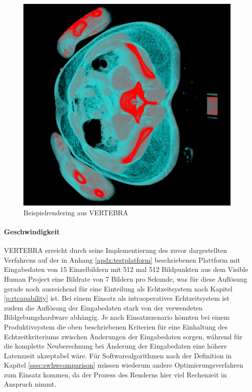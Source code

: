 \documentclass[ngerman,pdftex,paper=A4,DIV=calc,titlepage,12pt]{scrartcl}
\newtheorem[L]{boxedDefinition}{Definition}
\begin{document}
\begin{figure}[p]
\begin{center}
\includegraphics[width=\textwidth]{graphics/vertebra-screenshot-1.png}
\caption{Beispielrendering aus VERTEBRA}
\label{fig:vertebra-screenshot}
\end{center}
\end{figure}\label{ssec:implementations}

\paragraph{Geschwindigkeit}
VERTEBRA erreicht durch seine Implementierung des zuvor dargestellten Verfahrens auf der in Anhang \vref{apdx:testplatform} beschriebenen Plattform mit Eingabedaten von 15 Einzelbildern mit 512 mal 512 Bildpunkten aus dem Visible Human Project eine Bildrate von 7 Bildern pro Sekunde, was für diese Auflösung gerade noch ausreichend für eine Einteilung als Echtzeitsystem nach Kapitel \vref{p:rtcapability} ist. Bei einem Einsatz als intraoperatives Echtzeitsystem ist zudem die Auflösung der Eingabedaten stark von der verwendeten Bildgebungshardware abhängig. Je nach Einsatzszenario könnten bei einem Produktivsystem die oben beschriebenen Kriterien für eine Einhaltung des Echtzeitkriteriums zwischen Änderungen der Eingabedaten sorgen, während für die komplette Neuberechnung bei Änderung der Eingabedaten eine höhere Latenzzeit akzeptabel wäre. Für Softwarealgorithmen nach der Definition in Kapitel \ref{ssec:swhwcomparison} müssen wiederum andere Optimierungsverfahren zum Einsatz kommen, da der Prozess des Renderns hier viel Rechenzeit in Anspruch nimmt.
\end{document}
